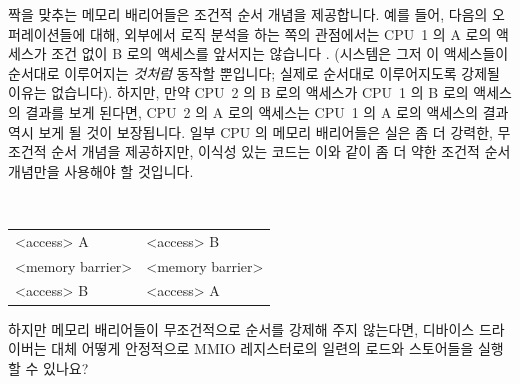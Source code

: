 짝을 맞추는 메모리 배리어들은 조건적 순서 개념을 제공합니다.
예를 들어, 다음의 오퍼레이션들에 대해, 외부에서 로직 분석을 하는 쪽의
관점에서는 CPU~1 의 A 로의 액세스가 조건 없이 B 로의 액세스를 앞서지는 않습니다
.
	  {(시스템은 그저 이 액세스들이 순서대로 이루어지는 \emph{것처럼}
	  동작할 뿐입니다; 실제로 순서대로 이루어지도록 강제될 이유는
	  없습니다).}
하지만, 만약 CPU~2 의 B 로의 액세스가 CPU~1 의 B 로의 액세스의 결과를 보게
된다면, CPU~2 의 A 로의 액세스는 CPU~1 의 A 로의 액세스의 결과 역시 보게 될
것이 보장됩니다.
일부 CPU 의 메모리 배리어들은 실은 좀 더 강력한, 무조건적 순서 개념을
제공하지만, 이식성 있는 코드는 이와 같이 좀 더 약한 조건적 순서 개념만을
사용해야 할 것입니다.

\vspace{5pt}
\begin{minipage}[t]{\columnwidth}
\tt
\scriptsize
\begin{tabular}{l|l}
	\nf{CPU 1}	& \nf{CPU 2} \\
	\hline
	<access> A	& <access> B \\
	<memory barrier>& <memory barrier> \\
	<access> B	& <access> A \\
\end{tabular}
\end{minipage}
\vspace{5pt}

\QuickQuiz{}
	하지만 메모리 배리어들이 무조건적으로 순서를 강제해 주지 않는다면,
	디바이스 드라이버는 대체 어떻게 안정적으로 MMIO 레지스터로의 일련의
	로드와 스토어들을 실행할 수 있나요?
	\iffalse

